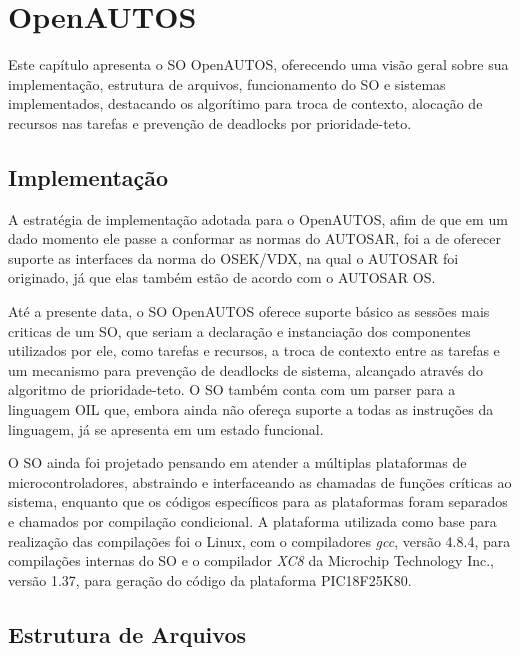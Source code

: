 \chapter{OpenAUTOS}

Este capítulo apresenta o SO OpenAUTOS, oferecendo uma visão geral sobre sua implementação, estrutura de arquivos, funcionamento do SO e sistemas implementados, destacando os algorítimo para troca de contexto, alocação de recursos nas tarefas e prevenção de deadlocks por prioridade-teto.

\section{Implementação}

A estratégia de implementação adotada para o OpenAUTOS, afim de que em um dado momento ele passe a conformar as normas do AUTOSAR, foi a de oferecer suporte as interfaces da norma do OSEK/VDX, na qual o AUTOSAR foi originado, já que elas também estão de acordo com o AUTOSAR OS.

Até a presente data, o SO OpenAUTOS oferece suporte básico as sessões mais criticas de um SO, que seriam a declaração e instanciação dos componentes utilizados por ele, como tarefas e recursos, a troca de contexto entre as tarefas e um mecanismo para prevenção de deadlocks de sistema, alcançado através do algoritmo de prioridade-teto. O SO também conta com um parser para a linguagem OIL que, embora ainda não ofereça suporte a todas as instruções da linguagem, já se apresenta em um estado funcional.

O SO ainda foi projetado pensando em atender a múltiplas plataformas de microcontroladores, abstraindo e interfaceando as chamadas de funções críticas ao sistema, enquanto que os códigos específicos para as plataformas foram separados e chamados por compilação condicional. A plataforma utilizada como base para realização das compilações foi o Linux, com o compiladores \emph{gcc}, versão 4.8.4, para compilações internas do SO e o compilador \emph{XC8} da Microchip Technology Inc., versão 1.37, para geração do código da plataforma PIC18F25K80.




\section{Estrutura de Arquivos} \label{cap:cap4_estrutura}

